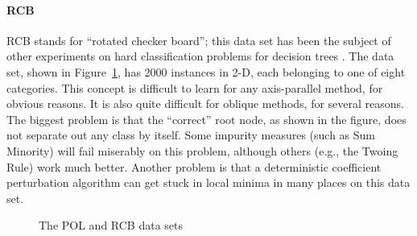 \paragraph{RCB}
RCB stands for ``rotated checker board''; this data set has been the
subject of other experiments on hard classification problems for
decision trees \cite{murthy/salzberg/94}.  The data set, shown in
Figure~\ref{figure:artificialdata}, has 2000 instances in 2-D, each
belonging to one of eight categories.  This concept is difficult to
learn for any axis-parallel method, for obvious reasons.  It is also
quite difficult for oblique methods, for several reasons.  The
biggest problem is that the ``correct'' root node, as shown in the
figure, does not separate out any class by itself.  Some impurity
measures (such as Sum Minority) will fail miserably on this problem,
although others (e.g., the Twoing Rule) work much better.  Another
problem is that a deterministic coefficient perturbation algorithm 
can get stuck in local minima in many places on this data set.
\begin{figure}
\vspace{2.0in}
\caption{The POL and RCB data sets}
\label{figure:artificialdata}
\vspace*{-.2in}
\end{figure}


